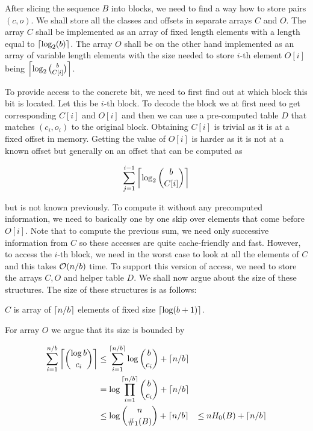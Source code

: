 After slicing the sequence $B$ into blocks, we need to find a way how to store pairs $(c, o)$.
We shall store all the classes and offsets in separate arrays $C$ and $O$. The array $C$ shall
be implemented as an array of fixed length elements with a length equal to
$\left\lceil \log_2(b) \right\rceil$. The array $O$ shall be on the other hand implemented as an array of
variable length elements with the size needed to store $i$-th element $O[i]$ being
$\left\lceil \log_2{b\choose C[i]} \right\rceil$.

To provide access to the concrete bit, we need to first find out at which block this bit is located.
Let this be $i$-th block. To decode the block we at first need to get corresponding $C[i]$ and
$O[i]$ and then we can use a pre-computed table $D$ that matches $(c_i, o_i)$ to the original
block. Obtaining $C[i]$ is trivial as it is at a fixed offset in memory. Getting the value of
$O[i]$ is harder as it is not at a known offset but generally on an offset that can be computed
as

                $$\sum_{j=1}^{i-1} \left\lceil \log_2{b\choose C[i]} \right\rceil$$

but is not known previously. To compute it without any precomputed information,
we need to basically one by one skip over elements that come before $O[i]$.
Note that to compute the previous sum, we need only successive information from $C$ so these
accesses are quite cache-friendly and fast. However, to access the $i$-th block, we need in the
worst case to look at all the elements of $C$ and this takes $\mathcal{O}(n/b)$ time. To support
this version of access, we need to store the arrays $C, O$ and helper table $D$. We shall
now argue about the size of these structures. The size of these structures is
as follows:

$C$ is array of $\left\lceil n/b \right\rceil$ elements of fixed size $\left\lceil \log(b+1) \right\rceil$.

For array $O$ we argue that its size is bounded by

\begin{align*}
    \sum_{i=1}^{n/b} \left\lceil {\log b\choose c_i} \right\rceil
    &\leq \sum_{i=1}^{\left\lceil n/b \right\rceil} \log {b\choose c_i} + \left\lceil n/b \right\rceil \\
    &= \log\prod_{i=1}^{\left\lceil n/b \right\rceil} {b\choose c_i} + \left\lceil n/b \right\rceil \\
    &\leq \log{n\choose \#_1(B)} + \left\lceil n/b \right\rceil &\leq nH_0(B) + \left\lceil n/b \right\rceil
\end{align*}

